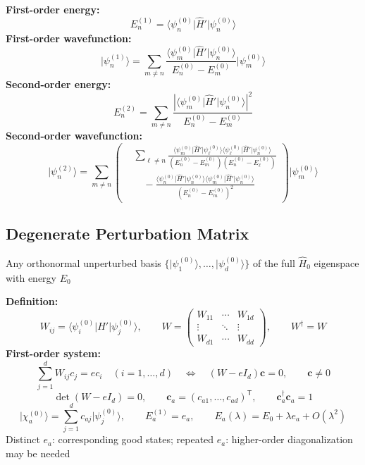\documentclass[12pt]{article}
\begin{document}
\textbf{First-order energy:}
\[
  E_n^{(1)}=\langle\psi_n^{(0)}\lvert\hat H'\rvert\psi_n^{(0)}\rangle
\]
\textbf{First-order wavefunction:}
\[
  \lvert\psi_n^{(1)}\rangle
  =\sum_{m\ne n}\frac{\langle\psi_m^{(0)}\lvert\hat H'\rvert\psi_n^{(0)}\rangle}
    {E_n^{(0)}-E_m^{(0)}}\lvert\psi_m^{(0)}\rangle
\]
\textbf{Second-order energy:}
\[
  E_n^{(2)}=\sum_{m\ne n}
  \frac{\left|\langle\psi_m^{(0)}\lvert\hat H'\rvert\psi_n^{(0)}\rangle\right|^2}
    {E_n^{(0)}-E_m^{(0)}}
\]
\textbf{Second-order wavefunction:}
\[
  \lvert\psi_n^{(2)}\rangle
  =\sum_{m\ne n}\left(
    \begin{aligned}
      &\sum_{\ell\ne n}
      \frac{\langle\psi_m^{(0)}\lvert\hat H'\rvert\psi_\ell^{(0)}\rangle
            \langle\psi_\ell^{(0)}\lvert\hat H'\rvert\psi_n^{(0)}\rangle}
        {(E_n^{(0)}-E_m^{(0)})(E_n^{(0)}-E_\ell^{(0)})}
      \\[0.5em]
      &\quad-
      \frac{\langle\psi_n^{(0)}\lvert\hat H'\rvert\psi_n^{(0)}\rangle
            \langle\psi_m^{(0)}\lvert\hat H'\rvert\psi_n^{(0)}\rangle}
        {(E_n^{(0)}-E_m^{(0)})^2}
    \end{aligned}
  \right)\lvert\psi_m^{(0)}\rangle
\]

\subsection{Degenerate Perturbation Matrix}

Any orthonormal unperturbed basis $\{\lvert\psi_1^{(0)}\rangle,\ldots,\lvert\psi_d^{(0)}\rangle\}$
of the full $\hat H_0$ eigenspace with energy $E_0$

\textbf{Definition:}
\[
  W_{ij}=\langle\psi_i^{(0)}\lvert\hat H'\rvert\psi_j^{(0)}\rangle,\qquad
  W=\begin{pmatrix}
    W_{11}&\cdots&W_{1d}\\
    \vdots&\ddots&\vdots\\
    W_{d1}&\cdots&W_{dd}
  \end{pmatrix},\qquad W^\dagger=W
\]
\textbf{First-order system:}
\[
  \sum_{j=1}^{d}W_{ij}c_j=e c_i\quad(i=1,\ldots,d)
  \quad\Longleftrightarrow\quad
  (W-eI_d)\boldsymbol c=0,\qquad\boldsymbol c\ne0
\]
\[
  \det(W-eI_d)=0,\qquad
  \boldsymbol c_a=(c_{a1},\ldots,c_{ad})^{\mathsf T},\qquad
  \boldsymbol c_a^\dagger\boldsymbol c_a=1
\]
\[
  \lvert\chi_a^{(0)}\rangle=\sum_{j=1}^{d}c_{aj}\lvert\psi_j^{(0)}\rangle,\qquad
  E_a^{(1)}=e_a,\qquad E_a(\lambda)=E_0+\lambda e_a+O(\lambda^2)
\]
Distinct $e_a$: corresponding good states;
repeated $e_a$: higher-order diagonalization may be needed
\end{document}

